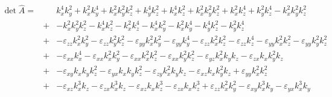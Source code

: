 \documentclass[12pt,a4paper,twoside,openright,BCOR10mm,headsepline,titlepage,abstracton,chapterprefix,final]{scrreprt}
\newcommand\wavenumber{k}
\newcommand\scalarpermittivity{\varepsilon}
\begin{document}
\begin{eqnarray}
 \det \hat{A} =&& 
       \wavenumber_x^4 \wavenumber_y^2 + \wavenumber_x^2 \wavenumber_y^4  + \wavenumber_x^2 \wavenumber_y^2 \wavenumber_z^2 + \wavenumber_y^4 \wavenumber_z^2 
    +  \wavenumber_x^4 \wavenumber_z^2 + \wavenumber_x^2 \wavenumber_y^2 \wavenumber_z^2 + \wavenumber_x^2 \wavenumber_z^4 + \wavenumber_y^2 \wavenumber_z^4 
    -  \wavenumber_x^2 \wavenumber_y^2 \wavenumber_z^2  
 \nonumber\\&+&
    -  \wavenumber_x^2 \wavenumber_y^2 \wavenumber_z^2   
    -  \wavenumber_x^4 \wavenumber_z^2   
    -  \wavenumber_x^2 \wavenumber_z^4  
    -  \wavenumber_x^4 \wavenumber_y^2  
    -  \wavenumber_x^2 \wavenumber_y^4      
    -  \wavenumber_y^4 \wavenumber_z^2  
    -  \wavenumber_y^2 \wavenumber_z^4     
 \nonumber\\[2ex]
 &+& 
    - \scalarpermittivity_{zz} \wavenumber_x^2 \wavenumber_y^2 - \scalarpermittivity_{zz} \wavenumber_y^2 \wavenumber_z^2 - \scalarpermittivity_{yy} \wavenumber_x^2 \wavenumber_y^2 - \scalarpermittivity_{yy} \wavenumber_y^4 
    - \scalarpermittivity_{zz} \wavenumber_x^2 \wavenumber_z^2 - \scalarpermittivity_{zz} \wavenumber_z^4 - \scalarpermittivity_{yy} \wavenumber_x^2 \wavenumber_z^2 - \scalarpermittivity_{yy} \wavenumber_y^2 \wavenumber_z^2 
 \nonumber\\&+& 
    - \scalarpermittivity_{xx} \wavenumber_x^4 - \scalarpermittivity_{xx} \wavenumber_x^2 \wavenumber_y^2 - \scalarpermittivity_{xx} \wavenumber_x^2 \wavenumber_z^2 - \scalarpermittivity_{xx} \wavenumber_y^2 \wavenumber_z^2  
    - \scalarpermittivity_{yz} \wavenumber_x^2 \wavenumber_y \wavenumber_z - \scalarpermittivity_{zx} \wavenumber_x \wavenumber_y^2 \wavenumber_z  
 \nonumber\\&+&   
    -  \scalarpermittivity_{xy} \wavenumber_x \wavenumber_y \wavenumber_z^2  
    - \scalarpermittivity_{yx} \wavenumber_x \wavenumber_y \wavenumber_z^2 - \scalarpermittivity_{zy} \wavenumber_x^2 \wavenumber_y \wavenumber_z  
    -  \scalarpermittivity_{xz} \wavenumber_x \wavenumber_y^2 \wavenumber_z   
    +  \scalarpermittivity_{yy} \wavenumber_x^2 \wavenumber_z^2  
 \nonumber\\&+&
    - \scalarpermittivity_{xz} \wavenumber_x^3 \wavenumber_z - \scalarpermittivity_{zx} \wavenumber_x^3 \wavenumber_z 
    - \scalarpermittivity_{xz} \wavenumber_x \wavenumber_z^3 - \scalarpermittivity_{zx} \wavenumber_x \wavenumber_z^3  
    +  \scalarpermittivity_{zz} \wavenumber_x^2 \wavenumber_y^2  
    - \scalarpermittivity_{xy} \wavenumber_x^3 \wavenumber_y - \scalarpermittivity_{yx} \wavenumber_x^3 \wavenumber_y  

\end{eqnarray}
\end{document}
